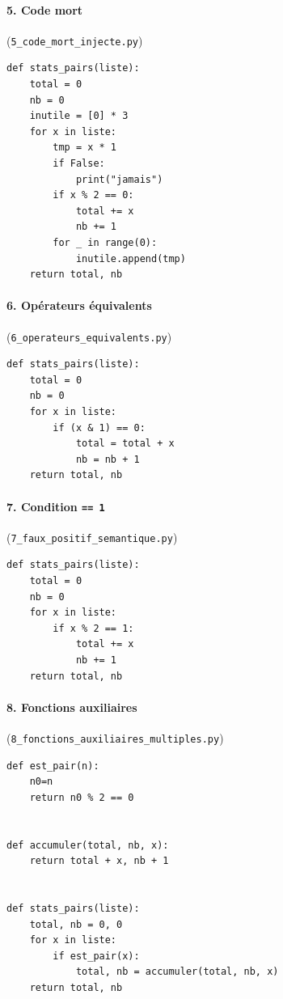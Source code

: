 \documentclass[12pt,a4paper,oneside]{report}
\begin{document}
\paragraph{5. Code mort} (\texttt{5\_code\_mort\_injecte.py})
\begin{lstlisting}[style=pyncst]
def stats_pairs(liste):
    total = 0
    nb = 0
    inutile = [0] * 3
    for x in liste:
        tmp = x * 1
        if False:
            print("jamais")
        if x % 2 == 0:
            total += x
            nb += 1
        for _ in range(0):
            inutile.append(tmp)
    return total, nb
\end{lstlisting}

\paragraph{6. Opérateurs équivalents} (\texttt{6\_operateurs\_equivalents.py})
\begin{lstlisting}[style=pyncst]
def stats_pairs(liste):
    total = 0
    nb = 0
    for x in liste:
        if (x & 1) == 0:
            total = total + x
            nb = nb + 1
    return total, nb
\end{lstlisting}

\paragraph{7. Condition \texttt{== 1}} (\texttt{7\_faux\_positif\_semantique.py})
\begin{lstlisting}[style=pyncst]
def stats_pairs(liste):
    total = 0
    nb = 0
    for x in liste:
        if x % 2 == 1:
            total += x
            nb += 1
    return total, nb
\end{lstlisting}

\paragraph{8. Fonctions auxiliaires} (\texttt{8\_fonctions\_auxiliaires\_multiples.py})
\begin{lstlisting}[style=pyncst]
def est_pair(n):
    n0=n
    return n0 % 2 == 0


def accumuler(total, nb, x):
    return total + x, nb + 1


def stats_pairs(liste):
    total, nb = 0, 0
    for x in liste:
        if est_pair(x):
            total, nb = accumuler(total, nb, x)
    return total, nb
\end{lstlisting}
\end{document}
